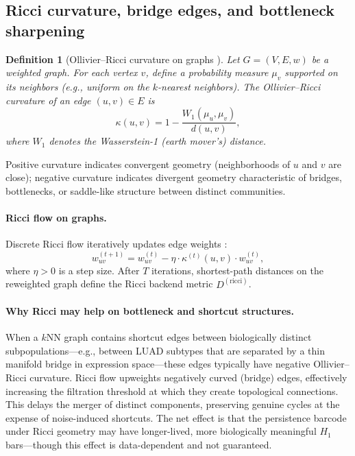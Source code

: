 \documentclass[11pt]{article}
\newtheorem{definition}[theorem]{Definition}
\begin{document}
\subsection{Ricci curvature, bridge edges, and bottleneck sharpening}
\label{sec:ricci}

\begin{definition}[Ollivier--Ricci curvature on graphs \cite{ollivier2007,ollivier2009}]\label{def:ricci}
Let $G = (V, E, w)$ be a weighted graph.
For each vertex $v$, define a probability measure $\mu_v$ supported on its neighbors (e.g., uniform on the $k$-nearest neighbors).
The \emph{Ollivier--Ricci curvature} of an edge $(u,v) \in E$ is
\[
\kappa(u,v) = 1 - \frac{W_1(\mu_u, \mu_v)}{d(u,v)},
\]
where $W_1$ denotes the Wasserstein-1 (earth mover's) distance.
\end{definition}

Positive curvature indicates convergent geometry (neighborhoods of $u$ and $v$ are close); negative curvature indicates divergent geometry characteristic of bridges, bottlenecks, or saddle-like structure between distinct communities.

\paragraph{Ricci flow on graphs.}
Discrete Ricci flow iteratively updates edge weights \cite{ni2019community}:
\[
w_{uv}^{(t+1)} = w_{uv}^{(t)} - \eta \cdot \kappa^{(t)}(u,v) \cdot w_{uv}^{(t)},
\]
where $\eta > 0$ is a step size.
After $T$ iterations, shortest-path distances on the reweighted graph define the Ricci backend metric $D^{(\text{ricci})}$.

\paragraph{Why Ricci may help on bottleneck and shortcut structures.}
When a $k$NN graph contains shortcut edges between biologically distinct subpopulations---e.g., between LUAD subtypes that are separated by a thin manifold bridge in expression space---these edges typically have negative Ollivier--Ricci curvature.
Ricci flow upweights negatively curved (bridge) edges, effectively increasing the filtration threshold at which they create topological connections.
This delays the merger of distinct components, preserving genuine cycles at the expense of noise-induced shortcuts.
The net effect is that the persistence barcode under Ricci geometry may have longer-lived, more biologically meaningful $H_1$ bars---though this effect is data-dependent and not guaranteed.
\end{document}
